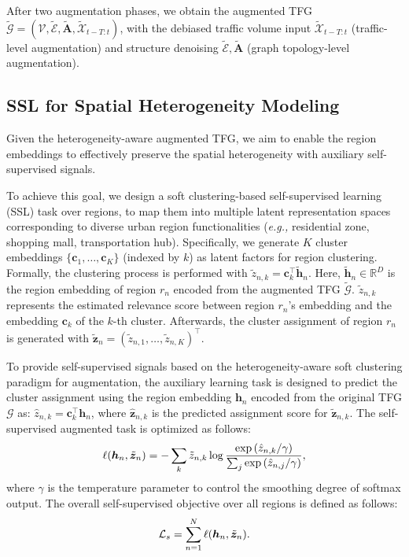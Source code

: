 \documentclass[letterpaper]{article} \usepackage{aaai23}  \usepackage{times}  \usepackage{helvet}  \usepackage{courier}  \usepackage[hyphens]{url}  \usepackage{graphicx} \urlstyle{rm} \def\UrlFont{\rm}  \usepackage{natbib}  \usepackage{caption} \frenchspacing  \setlength{\pdfpagewidth}{8.5in} \setlength{\pdfpageheight}{11in}
\newcommand{\eg}{\emph{e.g.,}\xspace}
\begin{document}
After two augmentation phases, we obtain the augmented TFG $\tilde{\mathcal{G}} = \left(\mathcal{V}, \tilde{\mathcal{E}}, \tilde{\bm A}, \tilde{\mathcal{X}}_{t-T:t}\right)$, with the debiased traffic volume input $\tilde{\mathcal{X}}_{t-T:t}$ (traffic-level augmentation) and structure denoising $\tilde{\mathcal{E}}, \tilde{\bm A}$ (graph topology-level augmentation).





\subsection{SSL for Spatial Heterogeneity Modeling}



Given the heterogeneity-aware augmented TFG, we aim to enable the region embeddings to effectively preserve the spatial heterogeneity with auxiliary self-supervised signals.

To achieve this goal, we design a soft clustering-based self-supervised learning (SSL) task over regions, to map them into multiple latent representation spaces corresponding to diverse urban region functionalities (\eg residential zone, shopping mall, transportation hub). Specifically, we generate $K$ cluster embeddings $\{\bm c_1, \dots, \bm c_K\}$ (indexed by $k$) as latent factors for region clustering. Formally, the clustering process is performed with $\tilde{z}_{n,k} = \bm c_k^\top \tilde{\bm h}_n$. Here, $\tilde{\bm h}_n\in \mathbb{R}^{D}$ is the region embedding of region $r_n$ encoded from the augmented TFG $\tilde{\mathcal{G}}$. $\tilde{z}_{n,k}$ represents the estimated relevance score between region $r_n$'s embedding and the embedding $\bm c_k$ of the $k$-th cluster. Afterwards, the cluster assignment of region $r_n$ is generated with $\tilde{\bm z}_n = (\tilde{z}_{n,1}, \dots, \tilde{z}_{n,K})^\top$.



To provide self-supervised signals based on the heterogeneity-aware soft clustering paradigm for augmentation, the auxiliary learning task is designed to predict the cluster assignment using the region embedding ${\bm h_n}$ encoded from the original TFG $\mathcal{G}$ as: $\hat{z}_{n,k} = \bm c_k^{\top}{\bm h_n}$, where $\hat{\bm z}_{n,k}$ is the predicted assignment score for $\tilde{\bm z}_{n,k}$. The self-supervised augmented task is optimized as follows:
\begin{equation}\label{eq:xent}\small
    \ell({\bm h}_n, \tilde{\bm z}_n) = -\sum_k \tilde{z}_{n,k} \log\frac{\exp \left(\hat{z}_{n,k}/\gamma \right)}{\sum_{j} \exp \left(\hat{z}_{n,j}/\gamma \right)},
\end{equation}
\noindent where $\gamma$ is the temperature parameter to control the smoothing degree of softmax output. The overall self-supervised objective over all regions is defined as follows:
\begin{equation}\label{eq:loss_s}\small
    \mathcal{L}_s =\sum_{n=1}^{N} \ell({\bm h}_n, \tilde{\bm z}_n).
\end{equation}
\end{document}
